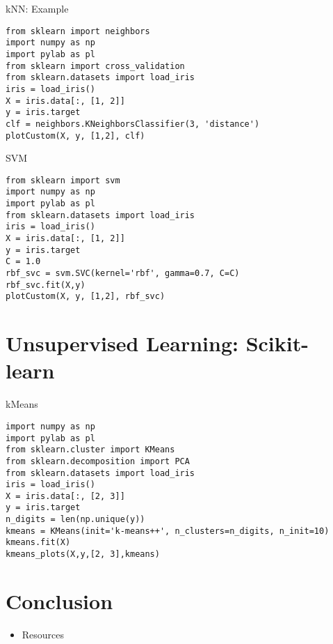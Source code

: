 \begin{frame}[fragile]{kNN: Example}

\begin{verbatim}
from sklearn import neighbors
import numpy as np
import pylab as pl
from sklearn import cross_validation
from sklearn.datasets import load_iris
iris = load_iris()
X = iris.data[:, [1, 2]]
y = iris.target
clf = neighbors.KNeighborsClassifier(3, 'distance')
plotCustom(X, y, [1,2], clf)
\end{verbatim}

\end{frame}

\begin{frame}[fragile]{SVM}

\begin{verbatim}
from sklearn import svm
import numpy as np
import pylab as pl
from sklearn.datasets import load_iris
iris = load_iris()
X = iris.data[:, [1, 2]]
y = iris.target
C = 1.0
rbf_svc = svm.SVC(kernel='rbf', gamma=0.7, C=C)
rbf_svc.fit(X,y)
plotCustom(X, y, [1,2], rbf_svc)
\end{verbatim}

\end{frame}

\section{Unsupervised Learning:
Scikit-learn}\label{unsupervised-learning-scikit-learn}

\begin{frame}[fragile]{kMeans}

\begin{verbatim}
import numpy as np
import pylab as pl
from sklearn.cluster import KMeans
from sklearn.decomposition import PCA
from sklearn.datasets import load_iris
iris = load_iris()
X = iris.data[:, [2, 3]]
y = iris.target
n_digits = len(np.unique(y))
kmeans = KMeans(init='k-means++', n_clusters=n_digits, n_init=10)
kmeans.fit(X)
kmeans_plots(X,y,[2, 3],kmeans)
\end{verbatim}

\end{frame}

\section{Conclusion}\label{conclusion}

\begin{itemize}
\itemsep1pt\parskip0pt
\item
  Resources
\end{itemize}
